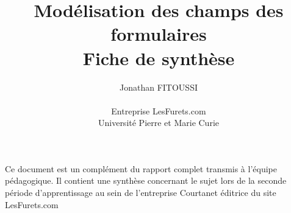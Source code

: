\documentclass[12pt,a4paper,oldfontcommands]{article}
\title{Modélisation des champs des formulaires\\Fiche de synthèse}
\author
{Jonathan FITOUSSI\\
\\
\normalsize{Entreprise LesFurets.com}\\
\normalsize{Université Pierre et Marie Curie}\\
}
\date{}
\begin{document}
 
\maketitle 

Ce document est un complément du rapport complet transmis à l'équipe pédagogique. Il contient une synthèse concernant le sujet lors de la seconde période d'apprentissage au sein de l'entreprise Courtanet éditrice du site LesFurets.com


\end{document}
